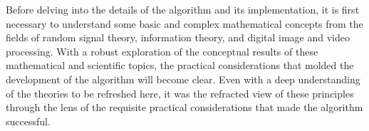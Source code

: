 %
%
%
%
%
%
%
%
%

%
%
%

Before delving into the details of the algorithm and its implementation, it is first necessary to understand some basic and complex mathematical concepts from the fields of random signal theory, information theory, and digital image and video processing. With a robust exploration of the conceptual results of these mathematical and scientific topics, the practical considerations that molded the development of the algorithm will become clear. Even with a deep understanding of the theories to be refreshed here, it was the refracted view of these principles through the lens of the requisite practical considerations that made the algorithm successful.


